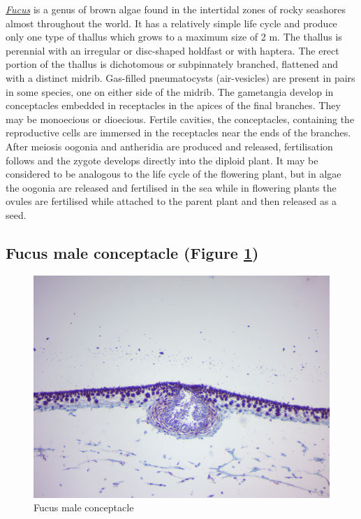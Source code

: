 \href{https://en.wikipedia.org/wiki/Fucus}{\emph{Fucus}} is a genus of
brown algae found in the intertidal zones of rocky seashores almost
throughout the world. It has a relatively simple life cycle and produce
only one type of thallus which grows to a maximum size of 2 m. The
thallus is perennial with an irregular or disc-shaped holdfast or with
haptera. The erect portion of the thallus is dichotomous or subpinnately
branched, flattened and with a distinct midrib. Gas-filled pneumatocysts
(air-vesicles) are present in pairs in some species, one on either side
of the midrib. The gametangia develop in conceptacles embedded in
receptacles in the apices of the final branches. They may be monoecious
or dioecious. Fertile cavities, the conceptacles, containing the
reproductive cells are immersed in the receptacles near the ends of the
branches. After meiosis oogonia and antheridia are produced and
released, fertilisation follows and the zygote develops directly into
the diploid plant. It may be considered to be analogous to the life
cycle of the flowering plant, but in algae the oogonia are released and
fertilised in the sea while in flowering plants the ovules are
fertilised while attached to the parent plant and then released as a
seed.

\subsection{Fucus male conceptacle (Figure
\ref{fig:malefucus})}\label{fucus-male-conceptacle-figure-reffigmalefucus}

\begin{figure}

{\centering \includegraphics[width=0.7\linewidth]{./figures/protists/male_fucus} 

}

\caption{Fucus male conceptacle}\label{fig:malefucus}
\end{figure}

